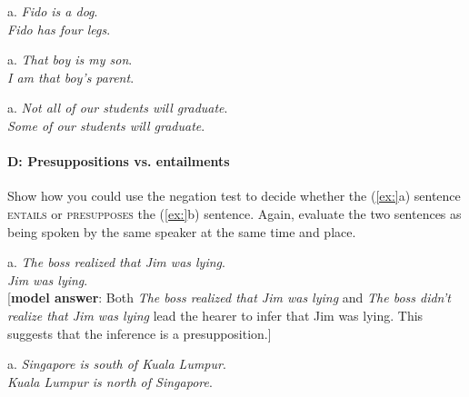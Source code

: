 \begin{stylepoints}
\ea%
    \label{ex:key:2}




          a. \textit{Fido is a dog}.\\
\ex \textit{Fido has four legs}.
    \z
\end{stylepoints}

\begin{stylepoints}
\ea%
    \label{ex:key:3}




          a. \textit{That boy is my son}.\\
\ex \textit{I am that boy’s parent}.
    \z
\end{stylepoints}

\begin{stylepoints}
\ea%
    \label{ex:key:4}




          a. \textit{Not all of our students will graduate}.\\
\ex \textit{Some of our students will graduate}.
    \z
\end{stylepoints}

\paragraph{D: Presuppositions vs. entailments}

Show how you could use the negation test to decide whether the (\ref{ex:}a) sentence \textsc{entails} or \textsc{presupposes} the (\ref{ex:}b) sentence. Again, evaluate the two sentences as being spoken by the same speaker at the same time and place.

\begin{stylepoints}
\ea%
    \label{ex:key:1}




          a. \textit{The boss realized that Jim was lying}.\\
\ex \textit{Jim was lying}.\\
{}[\textbf{model answer}: Both \textit{The boss realized that Jim was lying} and \textit{The boss didn’t realize that Jim was lying} lead the hearer to infer that Jim was lying. This suggests that the inference is a presupposition.]
    \z
\end{stylepoints}

\begin{stylepoints}
\ea%
    \label{ex:key:2}




          a. \textit{Singapore is south of Kuala Lumpur}.\\
\ex \textit{Kuala Lumpur is north of Singapore}.
    \z
\end{stylepoints}

